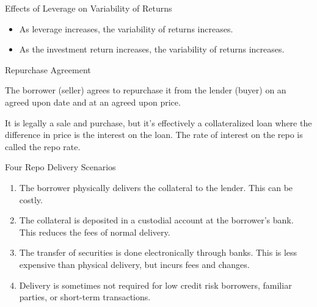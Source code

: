 \documentclass[../custom]{flashcards}
\begin{document}

\begin{flashcard}{Effects of Leverage on Variability of Returns}
    \begin{itemize}
        \item As leverage increases, the variability of returns increases.
        \item As the investment return increases, the variability of returns increases.
    \end{itemize}
\end{flashcard}

\begin{flashcard}{Repurchase Agreement}
    \begin{flushleft}
        The borrower (seller) agrees to repurchase it from the lender (buyer) on an agreed upon date and at an agreed upon price.\newline

        It is legally a sale and purchase, but it's effectively a collateralized loan where the difference in price is the interest on the loan. The rate of interest on the repo is called the repo rate.
    \end{flushleft}
\end{flashcard}

\begin{flashcard}{Four Repo Delivery Scenarios}
    \begin{enumerate}
        \item The borrower physically delivers the collateral to the lender. This can be costly.
        \item The collateral is deposited in a custodial account at the borrower's bank. This reduces the fees of normal delivery.
        \item The transfer of securities is done electronically through banks. This is less expensive than physical delivery, but incurs fees and changes.
        \item Delivery is sometimes not required for low credit risk borrowers, familiar parties, or short-term transactions.
    \end{enumerate}
\end{flashcard}
\end{document}
